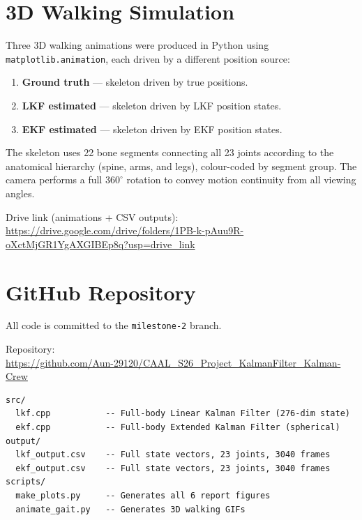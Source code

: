 \documentclass[11pt, a4paper]{article}
\begin{document}
\section{3D Walking Simulation}

Three 3D walking animations were produced in Python using
\texttt{matplotlib.animation}, each driven by a different position source:

\begin{enumerate}
  \item \textbf{Ground truth} --- skeleton driven by true positions.
  \item \textbf{LKF estimated} --- skeleton driven by LKF position states.
  \item \textbf{EKF estimated} --- skeleton driven by EKF position states.
\end{enumerate}

The skeleton uses 22 bone segments connecting all 23 joints according to the
anatomical hierarchy (spine, arms, and legs), colour-coded by segment group.
The camera performs a full $360^\circ$ rotation to convey motion continuity
from all viewing angles.

Drive link (animations + CSV outputs):\\
\url{https://drive.google.com/drive/folders/1PB-k-pAuu9R-oXctMjGR1YgAXGIBEp8q?usp=drive_link}

\section{GitHub Repository}

All code is committed to the \texttt{milestone-2} branch.

\noindent Repository:\\
\url{https://github.com/Aun-29120/CAAL_S26_Project_KalmanFilter_Kalman-Crew}

\begin{verbatim}
src/
  lkf.cpp           -- Full-body Linear Kalman Filter (276-dim state)
  ekf.cpp           -- Full-body Extended Kalman Filter (spherical)
output/
  lkf_output.csv    -- Full state vectors, 23 joints, 3040 frames
  ekf_output.csv    -- Full state vectors, 23 joints, 3040 frames
scripts/
  make_plots.py     -- Generates all 6 report figures
  animate_gait.py   -- Generates 3D walking GIFs
\end{verbatim}
\end{document}
